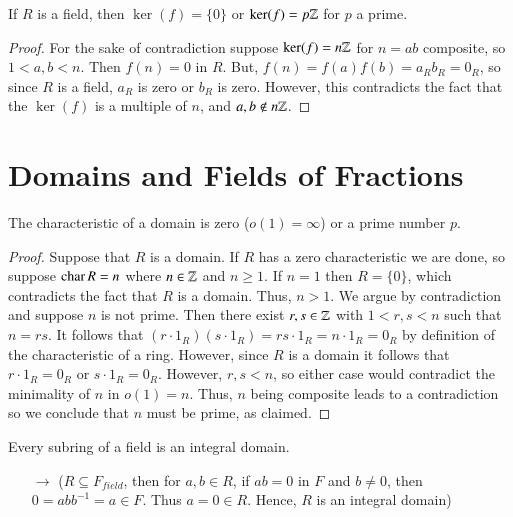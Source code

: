 \begin{proposition}
        If $R$ is a field, then $\ker(f) = \{0\}$ or $\ker(f) = p\mathbb Z$ for $p$ a prime.
\end{proposition}
\begin{proof}
        For the sake of contradiction suppose $\ker(f) = n\mathbb Z$ for $n = ab$ composite, so $1 < a,b < n$. Then $f(n) = 0$ in $R$. But, $f(n) = f(a)f(b) = a_Rb_R = 0_R$, so since $R$ is a field, $a_R$ is zero or $b_R$ is zero. However, this contradicts the fact that the $\ker(f)$ is a multiple of $n$, and $a,b \notin n\mathbb Z$.
\end{proof}





\section{ Domains and Fields of Fractions}

\begin{proposition}
    The characteristic of a domain is zero ($o(1) = \infty$) or a prime number $p$.
    \begin{proof}
        Suppose that $R$ is a domain. If $R$ has a zero characteristic we are done, so suppose $\operatorname{char} R = n$ where $n \in \mathbb Z$ and $n \geq 1$. If $n = 1$ then $R = \{0\}$, which contradicts the fact that $R$ is a domain. Thus, $n > 1$. We argue by contradiction and suppose $n$ is not prime. Then there exist $r,s \in \mathbb Z$ with $1 < r,s < n$ such that $n = rs$. It follows that $(r\cdot 1_R)(s\cdot 1_R) = rs\cdot 1_R = n\cdot 1_R = 0_R$ by definition of the characteristic of a ring. However, since $R$ is a domain it follows that $r\cdot 1_R = 0_R$ or $s \cdot 1_R = 0_R$. However, $r,s < n$, so either case would contradict the minimality of $n$ in $o(1) = n$. Thus, $n$ being composite leads to a contradiction so we conclude that $n$ must be prime, as claimed.
    \end{proof}
\end{proposition}

\begin{remark}
    Every subring of a field is an integral domain.
    \begin{enumerate}
        \item[$\rightarrow$] ($R\subseteq F_{field}$, then for $a,b \in R$, if $ab = 0$ in $F$ and $b \neq 0$, then $0 = abb^{-1} = a \in F$. Thus $a = 0 \in R$. Hence, $R$ is an integral domain)
    \end{enumerate}
\end{remark}

